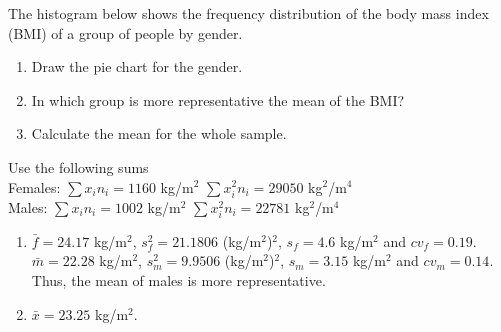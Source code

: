 {The histogram below shows the frequency distribution of the body mass index (BMI) of a group of people by gender.
\begin{center}
\resizebox{0.6\textwidth}{!}{}
\end{center}

\begin{enumerate}
\item Draw the pie chart for the gender.
\item In which group is more representative the mean of the BMI?
\item Calculate the mean for the whole sample.
\end{enumerate}
Use the following sums\\
Females: $\sum x_in_i = 1160$ kg/m$^2$ \quad $\sum x_i^2n_i = 29050$ kg$^2$/m$^4$\\
Males: $\sum x_in_i = 1002$ kg/m$^2$ \quad $\sum x_i^2n_i = 22781$ kg$^2$/m$^4$
}
{\begin{enumerate}[start=2]
\item $\bar{f} =24.17$ kg/m$^2$, $s_{f}^2=21.1806$ (kg/m$^2$)$^2$, $s_f=4.6$ kg/m$^2$ and $cv_f = 0.19$.\\
$\bar{m} =22.28$ kg/m$^2$, $s_{m}^2=9.9506$ (kg/m$^2$)$^2$, $s_m=3.15$ kg/m$^2$ and $cv_m = 0.14$.
Thus, the mean of males is more representative.
\item $\bar{x}=23.25$ kg/m$^2$.
\end{enumerate}
}
